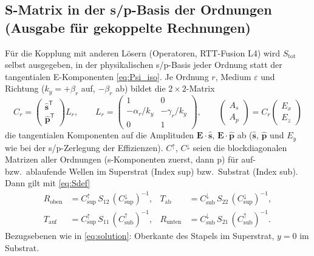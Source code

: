 \subsection{S-Matrix in der s/p-Basis der Ordnungen (Ausgabe für gekoppelte Rechnungen)}\label{sec:Ssp}
Für die Kopplung mit anderen Lösern (Operatoren, RTT-Fusion L4) wird $S_{\text{tot}}$ selbst ausgegeben, in
der physikalischen s/p-Basis jeder Ordnung statt der tangentialen E-Komponenten \eqref{eq:Psi_iso}. Je
Ordnung $r$, Medium $\varepsilon$ und Richtung ($k_y=+\beta_r$ auf, $-\beta_r$ ab) bildet die
$2\times2$-Matrix
\begin{equation}
  C_r=\begin{pmatrix}\hat{\mathbf s}^{\mathsf T}\\\hat{\mathbf p}^{\mathsf T}\end{pmatrix}L_r,\qquad
  L_r=\begin{pmatrix}1&0\\-\alpha_r/k_y&-\gamma_r/k_y\\0&1\end{pmatrix},\qquad
  \begin{pmatrix}A_s\\A_p\end{pmatrix}=C_r\begin{pmatrix}E_x\\E_z\end{pmatrix}
\end{equation}
die tangentialen Komponenten auf die Amplituden $\mathbf E\cdot\hat{\mathbf s}$, $\mathbf E\cdot\hat{\mathbf p}$ ab
($\hat{\mathbf s}$, $\hat{\mathbf p}$ und $E_y$ wie bei der s/p-Zerlegung der Effizienzen). $C^{\uparrow}$, $C^{\downarrow}$
seien die blockdiagonalen Matrizen aller Ordnungen (s-Komponenten zuerst, dann p) für auf- bzw.\ ablaufende
Wellen im Superstrat (Index sup) bzw.\ Substrat (Index sub). Dann gilt mit \eqref{eq:Sdef}
\begin{equation}
\begin{aligned}
  R_{\text{oben}}&=C^{\uparrow}_{\text{sup}}\,S_{12}\,(C^{\downarrow}_{\text{sup}})^{-1}, &
  T_{\text{ab}}&=C^{\downarrow}_{\text{sub}}\,S_{22}\,(C^{\downarrow}_{\text{sup}})^{-1},\\
  T_{\text{auf}}&=C^{\uparrow}_{\text{sup}}\,S_{11}\,(C^{\uparrow}_{\text{sub}})^{-1}, &
  R_{\text{unten}}&=C^{\downarrow}_{\text{sub}}\,S_{21}\,(C^{\uparrow}_{\text{sub}})^{-1}.
\end{aligned}
\label{eq:Ssp}
\end{equation}
Bezugsebenen wie in \eqref{eq:solution}: Oberkante des Stapels im Superstrat, $y=0$ im Substrat.
